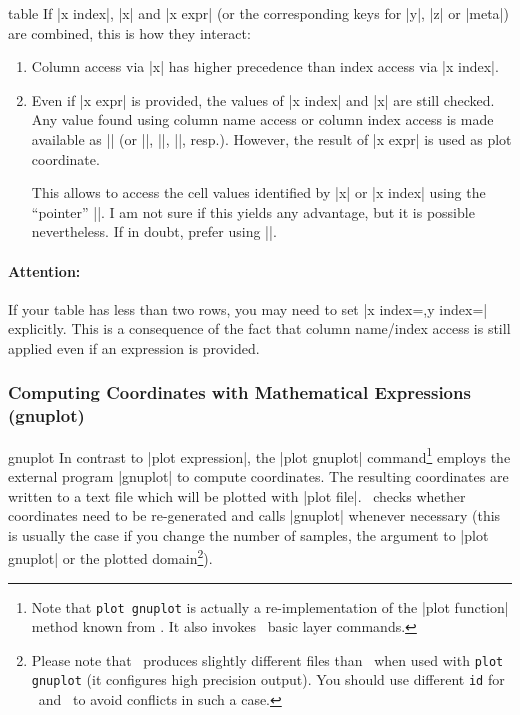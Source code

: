 {\begin{addplotoperation}[]{table}{}
	If |x index|, |x| and |x expr| (or the corresponding keys for |y|, |z| or |meta|) are combined, this is how they interact:
	\begin{enumerate}
		\item Column access via |x| has higher precedence than index access via |x index|.
		\item Even if |x expr| is provided, the values of |x index| and |x| are still checked. Any value found using column name access or column index access is made available as |\columnx| (or |\columny|, |\columnz|, |\columnmeta|, resp.). However, the result of |x expr| is used as plot coordinate.

		This allows to access the cell values identified by |x| or |x index| using the ``pointer'' |\columnx|. I am not sure if this yields any advantage, but it is possible nevertheless. If in doubt, prefer using |\thisrow|.
	\end{enumerate}

	\paragraph{Attention:} If your table has less than two rows, you may need to set |x index={},y index={}| explicitly. This is a consequence of the fact that column name/index access is still applied even if an expression is provided.
\end{addplotoperation}

\subsubsection{Computing Coordinates with Mathematical Expressions (gnuplot)}

\begin{addplotoperation}[]{gnuplot}{}
In contrast to |plot expression|, the |plot gnuplot| command\footnote{Note that \texttt{plot gnuplot} is actually a re-implementation of the |plot function| method known from \PGF. It also invokes \PGF\ basic layer commands.} employs the external program |gnuplot| to compute coordinates. The resulting coordinates are written to a text file which will be plotted with |plot file|. \PGF\ checks whether coordinates need to be re-generated and calls |gnuplot| whenever necessary (this is usually the case if you change the number of samples, the argument to |plot gnuplot| or the plotted domain\footnote{Please note that \PGFPlots\ produces slightly different files than \Tikz\ when used with \texttt{plot gnuplot} (it configures high precision output). You should use different \texttt{id} for \PGFPlots\ and \Tikz\ to avoid conflicts in such a case.}).


\end{addplotoperation}}
